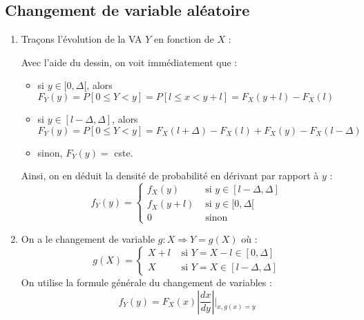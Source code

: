 \documentclass[main.tex]{subfiles}
\begin{document}
\subsection*{Changement de variable aléatoire}
\begin{enumerate}
\item Traçons l'évolution de la VA $Y$ en fonction de $X$ : \\

Avec l'aide du dessin, on voit immédiatement que :
\begin{itemize}
\item si $y\in[0,\Delta[$, alors $F_Y(y) = P[0 \leq Y < y] = P[l \leq x < y+l] = F_X(y+l) - F_X(l)$
\item si $y\in[l-\Delta,\Delta]$, alors $F_Y(y) = P[0 \leq Y < y] = F_X(l+\Delta) - F_X(l) + F_X(y) - F_X(l-\Delta)$
\item sinon, $F_Y(y) = $ cste.
\end{itemize}

Ainsi, on en déduit la densité de probabilité en dérivant par rapport à $y$ :
\[
f_Y(y) = \left\{
\begin{array}{ll}
f_X(y) & \text{ si } y\in[l-\Delta,\Delta] \\
f_X(y+l) & \text{ si } y\in[0,\Delta[ \\
0 & \text{ sinon}
\end{array}
\right.
\]


\item On a le changement de variable $g: X \Rightarrow Y=g(X)$ où :
\[
g(X) = \left\{
\begin{array}{ll}
X+l & \text{ si } Y = X-l \in [0,\Delta] \\
X & \text{ si }Y = X \in [l-\Delta,\Delta]
\end{array}
\right.
\]
On utilise la formule générale du changement de variables :
\[ f_Y(y) = F_X(x) |\frac{dx}{dy}| |_{x,g(x)=y} \]


\end{enumerate}
\end{document}
